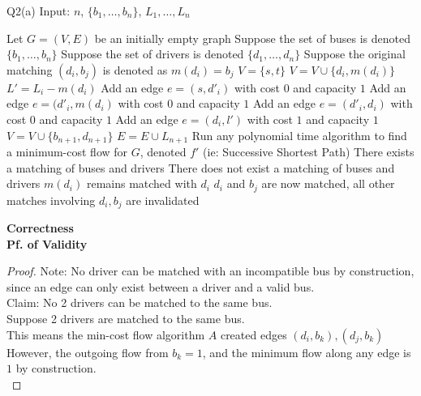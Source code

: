 \begin{problem}
    {Q2(a)}
Input: $n$, $\{b_1, \dots, b_n\}$, $L_1, \dots, L_n$
    \begin{algorithmic}[1]
        \STATE Let $G = (V, E)$ be an initially empty graph
        \STATE Suppose the set of buses is denoted $\{b_1, \dots, b_n\}$
        \STATE Suppose the set of drivers is denoted $\{d_1, \dots, d_n\}$
        \STATE Suppose the original matching $(d_i, b_j)$ is denoted as $m(d_i) = b_j$
        \STATE $V = \{s, t\}$
            \STATE $V = V \cup \{d_i, m(d_i)\}$
            \STATE $L' = L_i - m(d_i)$
            \STATE Add an edge $e = (s, d'_i)$ with cost $0$ and capacity $1$
            \STATE Add an edge $e = (d'_i, m(d_i)$ with cost $0$ and capacity $1$
            \STATE Add an edge $e = (d'_i, d_i)$ with cost $0$ and capacity $1$
                \STATE Add an edge $e = (d_i, l')$ with cost $1$ and capacity $1$
            \ENDFOR
        \ENDFOR
        \STATE $V = V \cup \{b_{n+1}, d_{n+1}\}$
        \STATE $E = E \cup L_{n+1}$
        \STATE Run any polynomial time algorithm to find a minimum-cost flow for $G$, denoted $f'$ (ie: Successive Shortest Path)
        \STATE There exists a matching of buses and drivers
        \ELSE
        \STATE There does not exist a matching of buses and drivers
        \ENDIF
        \STATE $m(d_i)$ remains matched with $d_i$
        \STATE $d_i$ and $b_j$ are now matched, all other matches involving $d_i, b_j$ are invalidated
        \ENDIF
    \end{algorithmic}
    \noindent
    \textbf{Correctness} \\
    \textbf{Pf. of Validity}
    \begin{proof}
        Note: No driver can be matched with an incompatible bus by construction, since an edge can only exist between a driver and a valid bus. \\
        Claim: No 2 drivers can be matched to the same bus. \\
        Suppose 2 drivers are matched to the same bus. \\
        This means the min-cost flow algorithm $A$ created edges $(d_i, b_k), (d_j, b_k)$ \\
        However, the outgoing flow from $b_k = 1$, and the minimum flow along any edge is $1$ by construction. \\

\end{proof}
\end{problem}
